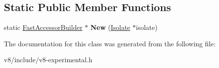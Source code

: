 \subsection*{Static Public Member Functions}
\begin{DoxyCompactItemize}
\item 
static \hyperlink{classv8_1_1experimental_1_1FastAccessorBuilder}{Fast\+Accessor\+Builder} $\ast$ {\bfseries New} (\hyperlink{classv8_1_1Isolate}{Isolate} $\ast$isolate)\hypertarget{classv8_1_1experimental_1_1FastAccessorBuilder_a2e0a7009b83376ae2f45b78159cd392c}{}\label{classv8_1_1experimental_1_1FastAccessorBuilder_a2e0a7009b83376ae2f45b78159cd392c}

\end{DoxyCompactItemize}


The documentation for this class was generated from the following file\+:\begin{DoxyCompactItemize}
\item 
v8/include/v8-\/experimental.\+h\end{DoxyCompactItemize}
